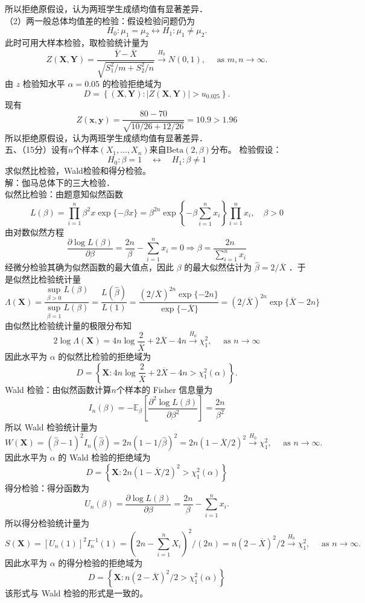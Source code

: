 \documentclass[UTF8]{ctexart}
\begin{document}
所以拒绝原假设，认为两班学生成绩均值有显著差异．\\
（2）两一般总体均值差的检验：假设检验问题仍为
$$
H_0: \mu_1=\mu_2 \longleftrightarrow H_1: \mu_1 \neq \mu_2 .
$$
此时可用大样本检验，取检验统计量为
$$
Z(\boldsymbol{X}, \boldsymbol{Y})=\frac{\overline{Y}-\overline{X}}{\sqrt{S_1^2 / m+S_2^2 / n}} \xrightarrow{H_0} N(0,1), \quad \text { as } m, n \rightarrow \infty .
$$
由 $z$ 检验知水平 $\alpha=0.05$ 的检验拒绝域为
$$
D=\left\{(\boldsymbol{X}, \boldsymbol{Y}):|Z(\boldsymbol{X}, \boldsymbol{Y})|>u_{0.025}\right\} .
$$
现有 
$$Z(\boldsymbol{x}, \boldsymbol{y})=\frac{80-70}{\sqrt{10 / 26+12 / 26}}=10.9>1.96$$
所以拒绝原假设，认为两班学生成绩均值有显著差异．\\




\noindent 五、（15分）设有$n$个样本$(X_1,...,X_n)$来自$\mathrm{Beta}(2,\beta)$分布。
检验假设：
\[
H_0: \beta = 1 \quad \leftrightarrow \quad H_1: \beta \neq 1
\]
求似然比检验，Wald检验和得分检验。\\
解：伽马总体下的三大检验．\\
似然比检验：由题意知似然函数
$$
L(\beta)=\prod_{i=1}^n \beta^2 x \exp \{-\beta x\}=\beta^{2 n} \exp \left\{-\beta \sum_{i=1}^n x_i\right\} \prod_{i=1}^n x_i, \quad \beta>0
$$
由对数似然方程
$$
\frac{\partial \log L(\beta)}{\partial \beta}=\frac{2 n}{\beta}-\sum_{i=1}^n x_i=0 \Rightarrow \beta=\frac{2 n}{\sum_{i=1}^n x_i}
$$
经微分检验其确为似然函数的最大值点，因此 $\beta$ 的最大似然估计为 $\hat{\beta}=2 / \overline{X}$ ．于是似然比检验统计量
$$
\Lambda(\boldsymbol{X})=\frac{\sup _{\beta>0} L(\beta)}{\sup _{\beta=1} L(\beta)}=\frac{L(\hat{\beta})}{L(1)}=\frac{(2 / \overline{X})^{2 n} \exp \{-2 n\}}{\exp \{-\overline{X}\}}=(2 / \overline{X})^{2 n} \exp \{\overline{X}-2 n\}
$$
由似然比检验统计量的极限分布知
$$
2 \log \Lambda(\boldsymbol{X})=4 n \log \frac{2}{\overline{X}}+2 \overline{X}-4 n \xrightarrow{H_0} \chi_1^2, \quad \text { as } n \rightarrow \infty
$$
因此水平为 $\alpha$ 的似然比检验的拒绝域为
$$
D=\left\{\boldsymbol{X}: 4 n \log \frac{2}{\overline{X}}+2 \overline{X}-4 n>\chi_1^2(\alpha)\right\} .
$$
Wald 检验：由似然函数计算$n$个样本的 Fisher 信息量为
$$
I_n(\beta)=-\mathbb{E}_\beta\left[\frac{\partial^2 \log L(\beta)}{\partial \beta^2}\right]=\frac{2 n}{\beta^2}
$$
所以 Wald 检验统计量为
$$
W(\boldsymbol{X})=(\hat{\beta}-1)^2 I_n(\hat{\beta})=2 n(1-1 / \hat{\beta})^2=2 n(1-\overline{X} / 2)^2 \xrightarrow{H_0} \chi_1^2, \quad \text { as } n \rightarrow \infty .
$$
因此水平为 $\alpha$ 的 Wald 检验的拒绝域为 
$$D=\left\{\boldsymbol{X}: 2 n(1-\overline{X} / 2)^2>\chi_1^2(\alpha)\right\}$$
得分检验：得分函数为
$$
U_n(\beta)=\frac{\partial \log L(\beta)}{\partial \beta}=\frac{2 n}{\beta}-\sum_{i=1}^n x_i .
$$
所以得分检验统计量为
$$
S(\boldsymbol{X})=\left[U_n(1)\right]^2 I_n^{-1}(1)=\left(2 n-\sum_{i=1}^n X_i\right)^2 /(2 n)=n(2-\overline{X})^2 / 2 \xrightarrow{H_0} \chi_1^2, \quad \text { as } n \rightarrow \infty .
$$
因此水平为 $\alpha$ 的得分检验的拒绝域为 
$$D=\left\{\boldsymbol{X}: n(2-\overline{X})^2 / 2>\chi_1^2(\alpha)\right\}$$
该形式与 Wald 检验的形式是一致的。\\
\end{document}

